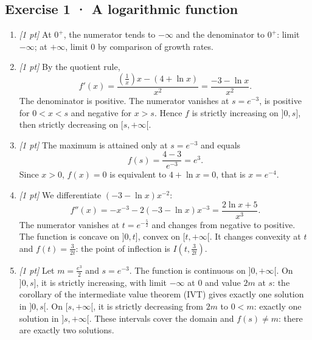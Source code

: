 \subsection*{Exercise 1 · A logarithmic function}\begin{enumerate}

\item \textit{[1 pt]} At $0^+$, the numerator tends to $-\infty$ and the denominator to $0^+$: limit $-\infty$; at $+\infty$, limit $0$ by comparison of growth rates.

\item \textit{[1 pt]} By the quotient rule,
\[f'(x)=\frac{(\frac{1}{x})x-(4+\ln x)}{x^2}=\frac{-3-\ln x}{x^2}.\]
The denominator is positive. The numerator vanishes at $s=e^{-3}$, is positive for $0<x<s$ and negative for $x>s$. Hence $f$ is strictly increasing on $]0,s]$, then strictly decreasing on $[s,+\infty[$.

\item \textit{[1 pt]} The maximum is attained only at $s=e^{-3}$ and equals
\[f(s)=\frac{4- 3}{e^{-3}}=e^{3}.\]
Since $x>0$, $f(x)=0$ is equivalent to $4+\ln x=0$, that is $x=e^{-4}$.

\item \textit{[1 pt]} We differentiate $(-3-\ln x)x^{-2}$:
\[f''(x)=-x^{-3}-2(-3-\ln x)x^{-3}=\frac{2\ln x+5}{x^3}.\]
The numerator vanishes at $t=e^{-\frac{5}{2}}$ and changes from negative to positive. The function is concave on $]0,t]$, convex on $[t,+\infty[$. It changes convexity at $t$ and $f(t)=\frac{3}{2t}$: the point of inflection is $I(t,\frac{3}{2t})$.

\item \textit{[1 pt]} Let $m=\frac{e^{3}}{2}$ and $s=e^{-3}$. The function is continuous on $]0,+\infty[$. On $]0,s]$, it is strictly increasing, with limit $-\infty$ at $0$ and value $2m$ at $s$: the corollary of the intermediate value theorem (IVT) gives exactly one solution in $]0,s[$. On $[s,+\infty[$, it is strictly decreasing from $2m$ to $0<m$: exactly one solution in $]s,+\infty[$. These intervals cover the domain and $f(s)\ne m$: there are exactly two solutions.

\end{enumerate}

